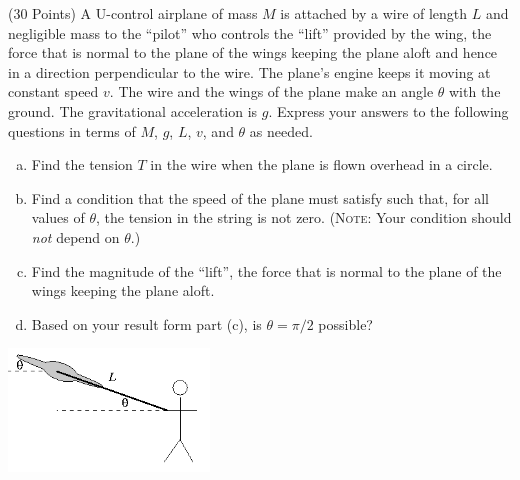 \documentclass{esg8012exam}
\begin{document}
\begin{problem}{(30 Points)}
  A U-control airplane of mass $M$ is attached by a wire of length $L$ and negligible mass to the ``pilot'' who controls the ``lift'' provided by the wing, the force that is normal to the plane of the wings keeping the plane aloft and hence in a direction perpendicular to the wire.  The plane's engine keeps it moving at constant speed $v$.  The wire and the wings of the plane make an angle $\theta$ with the ground.  The gravitational acceleration is $g$.  Express your answers to the following questions in terms of $M$, $g$, $L$, $v$, and $\theta$ as needed.
  \begin{enumerate}[(a)]
    \item Find the tension $T$ in the wire when the plane is flown overhead in a circle.
    \item Find a condition that the speed of the plane must satisfy such that, for all values of $\theta$, the tension in the string is not zero. (\textsc{Note}: Your condition should \emph{not} depend on $\theta$.)
    \item Find the magnitude of the ``lift'', the force that is normal to the plane of the wings keeping the plane aloft.
    \item Based on your result form part (c), is $\theta = \pi / 2$ possible?
  \end{enumerate}
  \begin{center}\includegraphics[width=0.4\textwidth]{exam1_p3_1}\end{center}
\end{problem}
\end{document}
